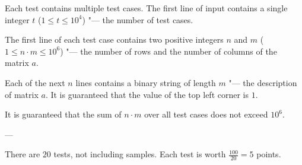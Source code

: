 Each test contains multiple test cases. The first line of input contains a single integer $t$ ($1 \le t \le 10^4$) "--- the number of test cases.

The first line of each test case contains two positive integers $n$ and $m$ ($1 \le n \cdot m \le 10^6$) "--- the number of rows and the number of columns of the matrix $a$.

Each of the next $n$ lines contains a binary string of length $m$ "--- the description of matrix $a$. It is guaranteed that the value of the top left corner is $1$.

It is guaranteed that the sum of $n \cdot m$ over all test cases does not exceed $10^6$.

---

There are $20$ tests, not including samples. Each test is worth $\frac{100}{20}=5$ points.
